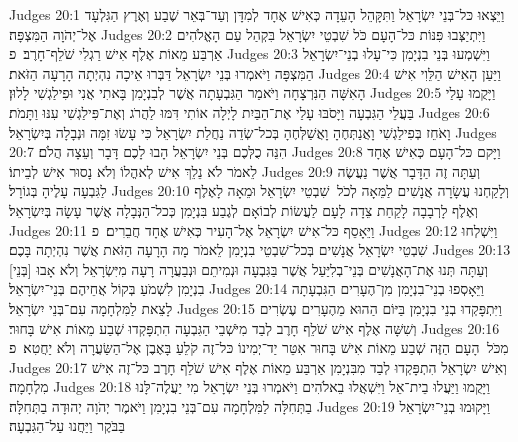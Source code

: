Judges 20:1	וַיֵּצְאוּ כּל־בְּנֵי יִשְׂרָאֵל וַתִּקָּהֵל הָעֵדָה כְּאִישׁ אֶחָד לְמִדָּן וְעַד־בְּאֵר שֶׁבַע וְאֶרֶץ הַגִּלְעָד אֶל־יְהֹוָה הַמִּצְפָּה׃
Judges 20:2	וַיִּתְיַצְּבוּ פִּנּוֹת כּל־הָעָם כֹּל שִׁבְטֵי יִשְׂרָאֵל בִּקְהַל עַם הָאֱלֹהִים אַרְבַּע מֵאוֹת אֶלֶף אִישׁ רַגְלִי שֹׁלֵף־חָרֶב׃ {פ}
Judges 20:3	וַיִּשְׁמְעוּ בְּנֵי בִנְיָמִן כִּי־עָלוּ בְנֵי־יִשְׂרָאֵל הַמִּצְפָּה וַיֹּאמְרוּ בְּנֵי יִשְׂרָאֵל דַּבְּרוּ אֵיכָה נִהְיְתָה הָרָעָה הַזֹּאת׃
Judges 20:4	וַיַּעַן הָאִישׁ הַלֵּוִי אִישׁ הָאִשָּׁה הַנִּרְצָחָה וַיֹּאמַר הַגִּבְעָתָה אֲשֶׁר לְבִנְיָמִן בָּאתִי אֲנִי וּפִילַגְשִׁי לָלוּן׃
Judges 20:5	וַיָּקֻמוּ עָלַי בַּעֲלֵי הַגִּבְעָה וַיָּסֹבּוּ עָלַי אֶת־הַבַּיִת לָיְלָה אוֹתִי דִּמּוּ לַהֲרֹג וְאֶת־פִּילַגְשִׁי עִנּוּ וַתָּמֹת׃
Judges 20:6	וָאֹחֵז בְּפִילַגְשִׁי וָאֲנַתְּחֶהָ וָאֲשַׁלְּחֶהָ בְּכל־שְׂדֵה נַחֲלַת יִשְׂרָאֵל כִּי עָשׂוּ זִמָּה וּנְבָלָה בְּיִשְׂרָאֵל׃
Judges 20:7	הִנֵּה כֻלְּכֶם בְּנֵי יִשְׂרָאֵל הָבוּ לָכֶם דָּבָר וְעֵצָה הֲלֹם׃
Judges 20:8	וַיָּקם כּל־הָעָם כְּאִישׁ אֶחָד לֵאמֹר לֹא נֵלֵךְ אִישׁ לְאהֳלוֹ וְלֹא נָסוּר אִישׁ לְבֵיתוֹ׃
Judges 20:9	וְעַתָּה זֶה הַדָּבָר אֲשֶׁר נַעֲשֶׂה לַגִּבְעָה עָלֶיהָ בְּגוֹרָל׃
Judges 20:10	וְלָקַחְנוּ עֲשָׂרָה אֲנָשִׁים לַמֵּאָה לְכֹל  שִׁבְטֵי יִשְׂרָאֵל וּמֵאָה לָאֶלֶף וְאֶלֶף לָרְבָבָה לָקַחַת צֵדָה לָעָם לַעֲשׂוֹת לְבוֹאָם לְגֶבַע בִּנְיָמִן כְּכל־הַנְּבָלָה אֲשֶׁר עָשָׂה בְּיִשְׂרָאֵל׃
Judges 20:11	וַיֵּאָסֵף כּל־אִישׁ יִשְׂרָאֵל אֶל־הָעִיר כְּאִישׁ אֶחָד חֲבֵרִים׃ {פ}
Judges 20:12	וַיִּשְׁלְחוּ שִׁבְטֵי יִשְׂרָאֵל אֲנָשִׁים בְּכל־שִׁבְטֵי בִנְיָמִן לֵאמֹר מָה הָרָעָה הַזֹּאת אֲשֶׁר נִהְיְתָה בָּכֶם׃
Judges 20:13	וְעַתָּה תְּנוּ אֶת־הָאֲנָשִׁים בְּנֵי־בְלִיַּעַל אֲשֶׁר בַּגִּבְעָה וּנְמִיתֵם וּנְבַעֲרָה רָעָה מִיִּשְׂרָאֵל וְלֹא אָבוּ [בְּנֵי] בִנְיָמִן לִשְׁמֹעַ בְּקוֹל אֲחֵיהֶם בְּנֵי־יִשְׂרָאֵל׃
Judges 20:14	וַיֵּאָסְפוּ בְנֵי־בִנְיָמִן מִן־הֶעָרִים הַגִּבְעָתָה לָצֵאת לַמִּלְחָמָה עִם־בְּנֵי יִשְׂרָאֵל׃
Judges 20:15	וַיִּתְפָּקְדוּ בְנֵי בִנְיָמִן בַּיּוֹם הַהוּא מֵהֶעָרִים עֶשְׂרִים וְשִׁשָּׁה אֶלֶף אִישׁ שֹׁלֵף חָרֶב לְבַד מִיֹּשְׁבֵי הַגִּבְעָה הִתְפָּקְדוּ שְׁבַע מֵאוֹת אִישׁ בָּחוּר׃
Judges 20:16	מִכֹּל  הָעָם הַזֶּה שְׁבַע מֵאוֹת אִישׁ בָּחוּר אִטֵּר יַד־יְמִינוֹ כּל־זֶה קֹלֵעַ בָּאֶבֶן אֶל־הַשַּׂעֲרָה וְלֹא יַחֲטִא׃ {פ}
Judges 20:17	וְאִישׁ יִשְׂרָאֵל הִתְפָּקְדוּ לְבַד מִבִּנְיָמִן אַרְבַּע מֵאוֹת אֶלֶף אִישׁ שֹׁלֵף חָרֶב כּל־זֶה אִישׁ מִלְחָמָה׃
Judges 20:18	וַיָּקֻמוּ וַיַּעֲלוּ בֵית־אֵל וַיִּשְׁאֲלוּ בֵאלֹהִים וַיֹּאמְרוּ בְּנֵי יִשְׂרָאֵל מִי יַעֲלֶה־לָּנוּ בַתְּחִלָּה לַמִּלְחָמָה עִם־בְּנֵי בִנְיָמִן וַיֹּאמֶר יְהֹוָה יְהוּדָה בַתְּחִלָּה׃
Judges 20:19	וַיָּקוּמוּ בְנֵי־יִשְׂרָאֵל בַּבֹּקֶר וַיַּחֲנוּ עַל־הַגִּבְעָה׃
